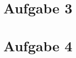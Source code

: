 \documentclass{article}
\begin{document}
	\section*{Aufgabe 3}
	
	\section*{Aufgabe 4}
\end{document}
